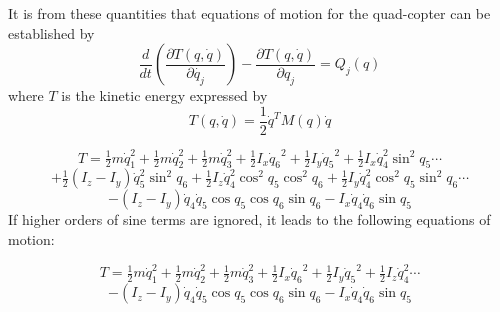\documentclass[twocolumn,10pt]{asme2e}
\begin{document}
{It is from these quantities that equations of motion for the quad-copter can be established by
\begin{equation}
\frac{d}{dt}\left(\frac{\partial T(q,\dot{q})}{\partial\dot{q_{j}}}\right)-\frac{\partial T(q,\dot{q})}{\partial q_{j}}=Q_{j}(q)\label{eqL}
\end{equation}
 where $T$ is the kinetic energy  expressed  by
\begin{equation}
T(q,\dot{q})=\frac{1}{2}\dot{q}^{T}M(q)\dot{q}
\end{equation}
%

\[T= \tfrac{1}{2}m\dot{q}_{1}^2+\tfrac{1}{2}m\dot{q}_{2}^2+\tfrac{1}{2}m\dot{q}_{3}^2+\tfrac{1}{2}I_{x}{\dot{q}_{6}}^2+\tfrac{1}{2}I_{y}{\dot{q}_{5}}^2+\tfrac{1}{2}I_{x}\dot{q}_{4}^2\sin^2q_{5}\cdots\]
\[+\tfrac{1}{2}(I_{z}-I_y)\dot{q}_{5}^2\sin^2q_{6}+\tfrac{1}{2}I_{z}\dot{q}_{4}^2\cos^2q_{5}\cos^2q_{6}+\tfrac{1}{2}I_{y}\dot{q}_{4}^2\cos^2{q}_{5}\sin^2q_{6}\cdots\]
\[-(I_{z}-I_y)\dot{q}_{4}\dot{q}_{5}\cos{q}_{5}\cos{q}_{6}\sin{q}_{6}-I_{x}\dot{q}_{4}\dot{q}_{6}\sin{q}_{5} \]
If higher orders of sine terms are ignored, it leads to the following equations of motion:


\[T= \tfrac{1}{2}m\dot{q}_{1}^2+\tfrac{1}{2}m\dot{q}_{2}^2+\tfrac{1}{2}m\dot{q}_{3}^2+\tfrac{1}{2}I_{x}{\dot{q}_{6}}^2+\tfrac{1}{2}I_{y}{\dot{q}_{5}}^2+\tfrac{1}{2}I_{z}\dot{q}_{4}^2\cdots\]
\[-(I_{z}-I_y)\dot{q}_{4}\dot{q}_{5}\cos{q}_{5}\cos{q}_{6}\sin{q}_{6}-I_{x}\dot{q}_{4}\dot{q}_{6}\sin{q}_{5} \]

}
\end{document}

